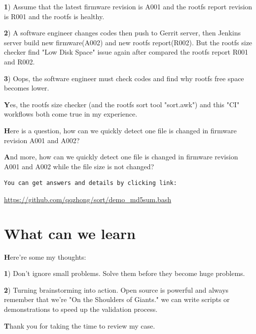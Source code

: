 \documentclass{article}
\begin{document}
\textbf
1) Assume that the latest firmware revision is A001 and the rootfs report revision is R001 and the rootfs is healthy.

\textbf
2) A software engineer changes codes then push to Gerrit server, then Jenkins server build new firmware(A002) and new rootfs report(R002). But the rootfs size checker find "Low Disk Space" issue again after compared the rootfs report R001 and R002.

\textbf
3) Oops, the software engineer must check codes and find why rootfs free space becomes lower.

\textbf
Yes, the rootfs size checker (and the rootfs sort tool "sort.awk") and this "CI" workflows both come true in my experience.


\textbf
Here is a question, how can we quickly detect one file is changed in firmware revision A001 and A002?

\textbf
And more, how can we quickly detect one file is changed in firmware revision A001 and A002 while the file size is not changed?

\begin{verbatim}
You can get answers and details by clicking link:
\end{verbatim}
\href{https://github.com/qqzhong/sort/demo\_md5sum.bash}{https://github.com/qqzhong/sort/demo\_md5sum.bash}


\section{What can we learn}

\textbf
Here're some my thoughts:

\textbf
1) Don't ignore small problems. Solve them before they become huge problems.


\textbf
2) Turning brainstorming into action. Open source is powerful and always remember that we're "On the Shoulders of Giants."
we can write scripts or demonstrations to speed up the validation process.

\textbf
Thank you for taking the time to review my case.
\end{document}
